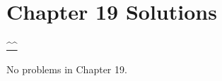 

\section{Chapter 19 Solutions}
\begin{center}\hyperref[toc]{\^{}\^{}}\end{center}
\setcounter{problem}{0}
\setcounter{solution}{0}
No problems in Chapter 19.